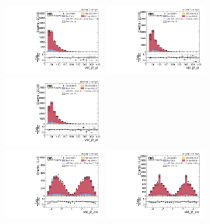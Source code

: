 \begin{figure}[!ht]
  \centering
  \includegraphics[width=0.335\textwidth]{analysis_plots/2016_zjj/cr_vjets_l/vbf_j2_pt.pdf} \hspace{-10pt}
  \includegraphics[width=0.335\textwidth]{analysis_plots/2017_zjj/cr_vjets_l/vbf_j2_pt.pdf} \hspace{-10pt}
  \includegraphics[width=0.335\textwidth]{analysis_plots/2018_zjj/cr_vjets_l/vbf_j2_pt.pdf} \hspace{-10pt} \\
  \includegraphics[width=0.335\textwidth]{analysis_plots/2016_zjj/cr_vjets_l/vbf_j2_eta.pdf} \hspace{-10pt}
  \includegraphics[width=0.335\textwidth]{analysis_plots/2017_zjj/cr_vjets_l/vbf_j2_eta.pdf} \hspace{-10pt}

\end{figure}
